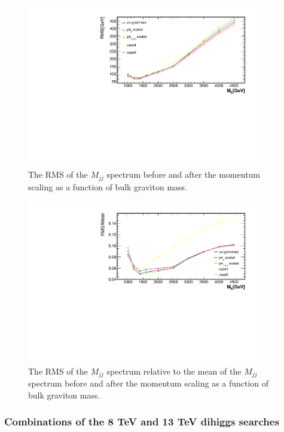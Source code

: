 \begin{figure}[htbp]
   \centering
   \includegraphics[width=0.9\textwidth]{figures/scale_mass/allcuts_RMS.pdf}
   \caption{The RMS of the $M_{jj}$ spectrum before and after the momentum 
     scaling as a function of bulk graviton mass.}
   \label{fig:RMS}
\end{figure}

\begin{figure}[htbp]
   \centering
   \includegraphics[width=0.9\textwidth]{figures/scale_mass/allcuts_RMS_Outof_Mean.pdf}
   \caption{The RMS of the $M_{jj}$ spectrum relative to the 
     mean of the $M_{jj}$ spectrum before and after the momentum 
     scaling as a function of bulk graviton mass.}
   \label{fig:RMSMean}
\end{figure}



\subsubsection*{Combinations of the 8 TeV and 13 TeV dihiggs searches}

